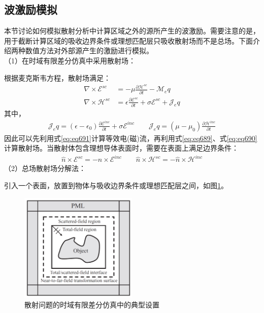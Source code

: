 \documentclass{article}
\numberwithin{equation}{section}
\renewcommand{\vec}[1]{\boldsymbol{#1}}
\begin{document}
\subsection{波激励模拟}
本节讨论如何模拟散射分析中计算区域之外的源所产生的波激励。需要注意的是，用于截断计算区域的吸收边界条件或理想匹配层只吸收散射场而不是总场。下面介绍两种数值方法对外部源产生的激励进行模拟。\\
（1）在时域有限差分仿真中采用散射场：\par
根据麦克斯韦方程，散射场满足：
\begin{align}
    \label{eq:eq689}
    \nabla\times\vec{\mathcal{E}}^{sc}&=-\mu\frac{\partial\vec{\mathcal{H}}^{sc}}{\partial t}-\vec{\mathcal{M}}_eq \\
    \label{eq:eq690}
    \nabla\times\vec{\mathcal{H}}^{sc}&=\epsilon\frac{\partial\vec{\mathcal{E}}^{sc}}{\partial t}+\sigma\vec{\mathcal{E}}^{sc}+\vec{\mathcal{J}}_eq
\end{align}
其中，
\begin{align}
    \label{eq:eq691}
    \vec{\mathcal{J}}_eq=(\epsilon-\epsilon_0)\frac{\partial \vec{\mathcal{E}}^{inc}}{\partial t}+\sigma\vec{\mathcal{E}}^{inc}\qquad\vec{\mathcal{J}}_eq=(\mu-\mu_0)\frac{\partial \vec{\mathcal{H}}^{inc}}{\partial t}
\end{align}
因此可以先利用式\ref{eq:eq691}计算等效电(磁)流，再利用式\ref{eq:eq689}、式\ref{eq:eq690}计算散射场。当散射体包含理想导体表面时，需要在表面上满足边界条件：
\begin{align}
    \label{eq:eq692}
    \hat{n}\times\vec{\mathcal{E}}^{sc}=-\hat{n}\times\vec{\mathcal{E}}^{inc}\qquad\hat{n}\times\vec{\mathcal{H}}^{sc}=-\hat{n}\times\vec{\mathcal{H}}^{inc}
\end{align}
（2）总场散射场分解法：\par
引入一个表面，放置到物体与吸收边界条件或理想匹配层之间，如图\ref{fig:fig54}。
\begin{figure}[ht]
    \centering
    \includegraphics[width=0.5\textwidth]{散射问题的时域有限差分仿真中的典型设置.PNG}
    \caption{散射问题的时域有限差分仿真中的典型设置}
    \label{fig:fig54}
\end{figure}
\end{document}
